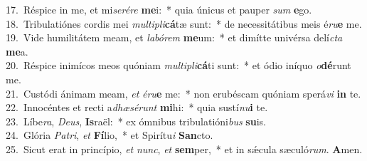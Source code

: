 {17.~}Réspice in me, et mi\textit{se}\textit{ré}\textit{re} \textbf{me}i:~* quia únicus et pauper \textit{sum} \textbf{e}go.\\
{18.~}Tribulatiónes cordis mei \textit{mul}\textit{ti}\textit{pli}\textbf{cá}tæ sunt:~* de necessitátibus meis é\textit{ru}\textbf{e} me.\\
{19.~}Vide humilitátem meam, et \textit{la}\textit{bó}\textit{rem} \textbf{me}um:~* et dimítte univérsa delí\textit{cta} \textbf{me}a.\\
{20.~}Réspice inimícos meos quóniam \textit{mul}\textit{ti}\textit{pli}\textbf{cá}ti sunt:~* et ódio iníquo \textit{o}\textbf{dé}runt me.\\
{21.~}Custódi ánimam meam, \textit{et} \textit{é}\textit{ru}\textbf{e} me:~* non erubéscam quóniam sperá\textit{vi} \textbf{in} te.\\
{22.~}Innocéntes et recti a\textit{dhæ}\textit{sé}\textit{runt} \textbf{mi}hi:~* quia sustí\textit{nu}\textbf{i} te.\\
{23.~}Líbe\textit{ra}, \textit{De}\textit{us}, \textbf{Is}raël:~* ex ómnibus tribulatióni\textit{bus} \textbf{su}is.\\
{24.~}Glória \textit{Pa}\textit{tri}, \textit{et} \textbf{Fí}lio,~* et Spirítu\textit{i} \textbf{San}cto.\\
{25.~}Sicut erat in princípio, \textit{et} \textit{nunc}, \textit{et} \textbf{sem}per,~* et in sǽcula sæculó\textit{rum}. \textbf{A}men.\\
